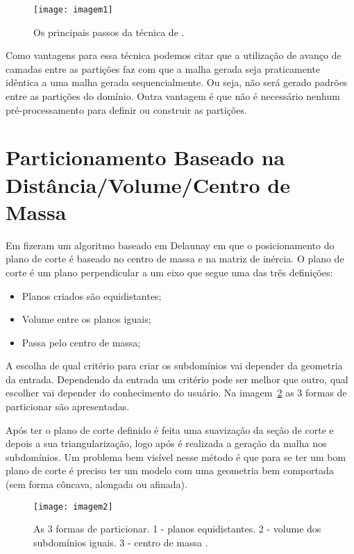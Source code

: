  \begin{figure}[htbp]
     \centering
     \texttt{[image: imagem1]}
     \caption{Os principais passos da técnica de \cite{bib:Pirzadeh09}.}
     \label{fig:imagem1}
 \end{figure}
 
 Como vantagens para essa técnica podemos citar que a utilização de avanço de camadas entre as partições faz com que a malha gerada seja praticamente idêntica a uma malha gerada sequencialmente. Ou seja, não será gerado padrões entre as partições do domínio. Outra vantagem é que não é necessário nenhum pré-processamento para definir ou construir as partições.

\section{Particionamento Baseado na Distância/Volume/Centro de Massa}
 
Em \cite{bib:Ivanov06} fizeram um algoritmo baseado em Delaunay em que o posicionamento do plano de corte é baseado no centro de massa e na matriz de inércia. O plano de corte é um plano perpendicular a um eixo que segue uma das três definições:

\begin{itemize}
  \item Planos criados são equidistantes;

  \item Volume entre os planos iguais;

  \item Passa pelo centro de massa;
\end{itemize}

A escolha de qual critério para criar os subdomínios vai depender da geometria da entrada. Dependendo da entrada um critério pode ser melhor que outro, qual escolher vai depender do conhecimento do usuário. Na imagem~\ref{fig:imagem2} as 3 formas de particionar são apresentadas.

Após ter o plano de corte definido é feita uma suavização da seção de corte e depois a sua triangularização, logo após é realizada a geração da malha nos subdomínios. Um problema bem visível nesse método é que para se ter um bom plano de corte é preciso ter um modelo com uma geometria bem comportada (sem forma côncava, alongada ou afinada).

 \begin{figure}[htbp]
     \centering
     \texttt{[image: imagem2]}
     \caption{As 3 formas de particionar. 1 - planos equidistantes. 2 - volume dos subdomínios iguais. 3 - centro de massa \cite{bib:Ivanov06}.}
     \label{fig:imagem2}
 \end{figure}


